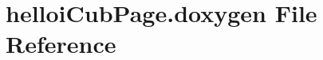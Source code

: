 \hypertarget{helloi_cub_page_8doxygen}{
\section{helloiCubPage.doxygen File Reference}
\label{helloi_cub_page_8doxygen}
}
